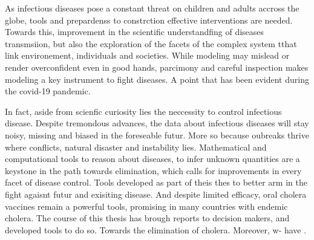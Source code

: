 As infectious diseases pose a constant threat on children and adults accross the globe, tools and prepardenss to constrction effective interventions are needed. Towards this, improvement in the scientific understandfing of diseases transmsiion, but also the exploration of the facets of the complex system tthat link environement, individuals and societies. While modeling may mislead or render overconfident even in good hands, parcimony and careful inspection makes modeling a key instrument to fight diseases. A point that has been evident during the covid-19 pandemic.

In fact, aside from scienfic curiosity lies the neccessity to control infectious disease. Despite tremondous advances, the data about infectious diseases will stay noisy, missing and biased in the foreseable futur. More so because oubreaks thrive where conflicts, natural disaster and instability lies. Mathematical and computational tools to reason about diseases, to infer unknown quantities are a keystone in the path towards elimination, which calls for improvements in every facet of disease control. Tools developed as part of theis thes to better arm in the fight agaisnt futur and exisiting disease.
And despite limited efficacy, oral cholera vaccines remain a powerful tools, promising in many countries with endemic cholera. 
The course of this thesis has brough reports to decision makers, and developed tools to do so. Towards the elimination of cholera. Moreover, w- have .
